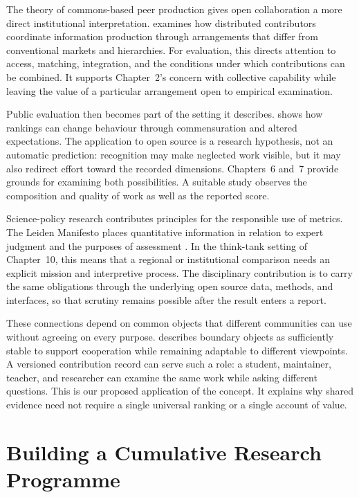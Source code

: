 The theory of commons-based peer production gives open collaboration a more direct institutional interpretation. \citet{benkler2002} examines how distributed contributors coordinate information production through arrangements that differ from conventional markets and hierarchies. For evaluation, this directs attention to access, matching, integration, and the conditions under which contributions can be combined. It supports Chapter~2's concern with collective capability while leaving the value of a particular arrangement open to empirical examination.

Public evaluation then becomes part of the setting it describes. \citet{espeland2007} shows how rankings can change behaviour through commensuration and altered expectations. The application to open source is a research hypothesis, not an automatic prediction: recognition may make neglected work visible, but it may also redirect effort toward the recorded dimensions. Chapters~6 and~7 provide grounds for examining both possibilities. A suitable study observes the composition and quality of work as well as the reported score.

Science-policy research contributes principles for the responsible use of metrics. The Leiden Manifesto places quantitative information in relation to expert judgment and the purposes of assessment \citep{hicks2015}. In the think-tank setting of Chapter~10, this means that a regional or institutional comparison needs an explicit mission and interpretive process. The disciplinary contribution is to carry the same obligations through the underlying open source data, methods, and interfaces, so that scrutiny remains possible after the result enters a report.

These connections depend on common objects that different communities can use without agreeing on every purpose. \citet{star1989} describes boundary objects as sufficiently stable to support cooperation while remaining adaptable to different viewpoints. A versioned contribution record can serve such a role: a student, maintainer, teacher, and researcher can examine the same work while asking different questions. This is our proposed application of the concept. It explains why shared evidence need not require a single universal ranking or a single account of value.

\FloatBarrier
\section{Building a Cumulative Research Programme}
\label{sec:ch11-programme}

